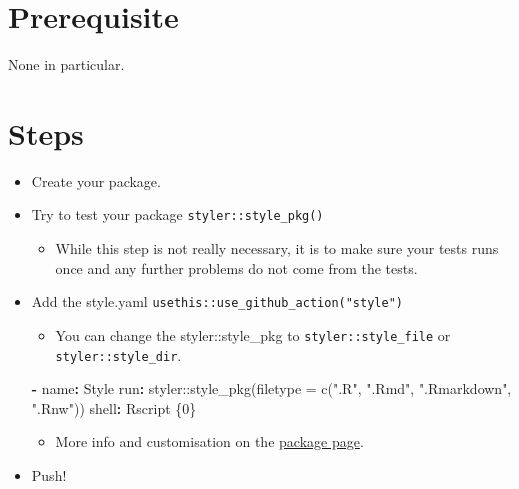 \documentclass[
]{book}
\newenvironment{Shaded}{\begin{snugshade}}{\end{snugshade}}
\newcommand{\AttributeTok}[1]{\textcolor[rgb]{0.77,0.63,0.00}{#1}}
\newcommand{\FunctionTok}[1]{\textcolor[rgb]{0.00,0.00,0.00}{#1}}
\newcommand{\KeywordTok}[1]{\textcolor[rgb]{0.13,0.29,0.53}{\textbf{#1}}}
\providecommand{\tightlist}{%
  \setlength{\itemsep}{0pt}\setlength{\parskip}{0pt}}
\begin{document}
\hypertarget{prerequisite-2}{%
\section{Prerequisite}\label{prerequisite-2}}

None in particular.

\hypertarget{steps-2}{%
\section{Steps}\label{steps-2}}

\begin{itemize}
\item
  Create your package.
\item
  Try to test your package \texttt{styler::style\_pkg()}

  \begin{itemize}
  \tightlist
  \item
    While this step is not really necessary, it is to make sure your tests runs once and any further problems do not come from the tests.
  \end{itemize}
\item
  Add the style.yaml \texttt{usethis::use\_github\_action("style")}

  \begin{itemize}
  \tightlist
  \item
    You can change the styler::style\_pkg to \texttt{styler::style\_file} or \texttt{styler::style\_dir}.
  \end{itemize}

\begin{Shaded}
\begin{Highlighting}[]
\AttributeTok{  }\KeywordTok{{-}}\AttributeTok{ }\FunctionTok{name}\KeywordTok{:}\AttributeTok{ Style}
\AttributeTok{    }\FunctionTok{run}\KeywordTok{:}\AttributeTok{ styler::style\_pkg(filetype = c(".R", ".Rmd", ".Rmarkdown", ".Rnw"))}
\AttributeTok{    }\FunctionTok{shell}\KeywordTok{:}\AttributeTok{ Rscript \{0\}}
\end{Highlighting}
\end{Shaded}

  \begin{itemize}
  \tightlist
  \item
    More info and customisation on the \href{https://styler.r-lib.org/articles/styler.html}{package page}.\\
  \end{itemize}
\item
  Push!
\end{itemize}
\end{document}
